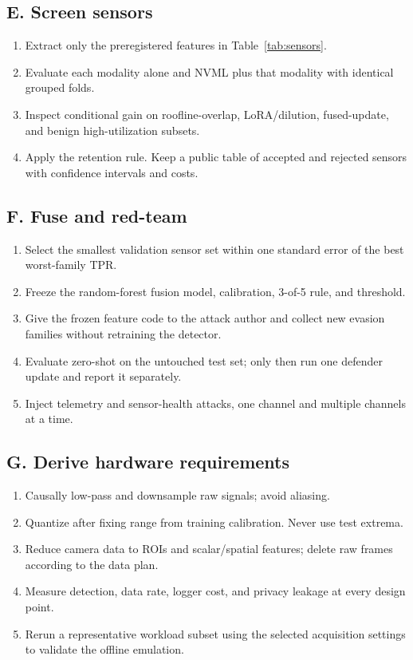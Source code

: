 \documentclass[sigplan,anonymous,review,nonacm]{acmart}
\begin{document}
\subsection{E. Screen sensors}

\begin{enumerate}
\item Extract only the preregistered features in Table~\ref{tab:sensors}.
\item Evaluate each modality alone and NVML plus that modality with identical grouped folds.
\item Inspect conditional gain on roofline-overlap, LoRA/dilution, fused-update, and benign high-utilization subsets.
\item Apply the retention rule. Keep a public table of accepted and rejected sensors with confidence intervals and costs.
\end{enumerate}

\subsection{F. Fuse and red-team}

\begin{enumerate}
\item Select the smallest validation sensor set within one standard error of the best worst-family TPR.
\item Freeze the random-forest fusion model, calibration, 3-of-5 rule, and threshold.
\item Give the frozen feature code to the attack author and collect new evasion families without retraining the detector.
\item Evaluate zero-shot on the untouched test set; only then run one defender update and report it separately.
\item Inject telemetry and sensor-health attacks, one channel and multiple channels at a time.
\end{enumerate}

\subsection{G. Derive hardware requirements}

\begin{enumerate}
\item Causally low-pass and downsample raw signals; avoid aliasing.
\item Quantize after fixing range from training calibration. Never use test extrema.
\item Reduce camera data to ROIs and scalar/spatial features; delete raw frames according to the data plan.
\item Measure detection, data rate, logger cost, and privacy leakage at every design point.
\item Rerun a representative workload subset using the selected acquisition settings to validate the offline emulation.
\end{enumerate}
\end{document}
